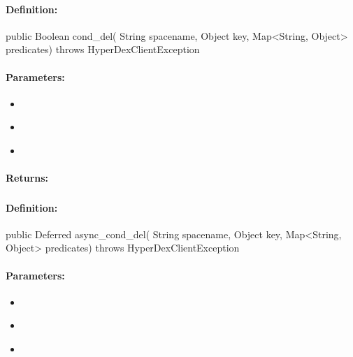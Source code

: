 \paragraph{Definition:}
\begin{javacode}
public Boolean cond_del(
        String spacename,
        Object key,
        Map<String, Object> predicates) throws HyperDexClientException
\end{javacode}

\paragraph{Parameters:}
\begin{itemize}[noitemsep]
\item {}\\

\item {}\\

\item {}\\

\end{itemize}

\paragraph{Returns:}


\pagebreak
\subsubsection{}
\label{api:java:async_cond_del}


\paragraph{Definition:}
\begin{javacode}
public Deferred async_cond_del(
        String spacename,
        Object key,
        Map<String, Object> predicates) throws HyperDexClientException
\end{javacode}

\paragraph{Parameters:}
\begin{itemize}[noitemsep]
\item {}\\

\item {}\\

\item {}\\

\end{itemize}

